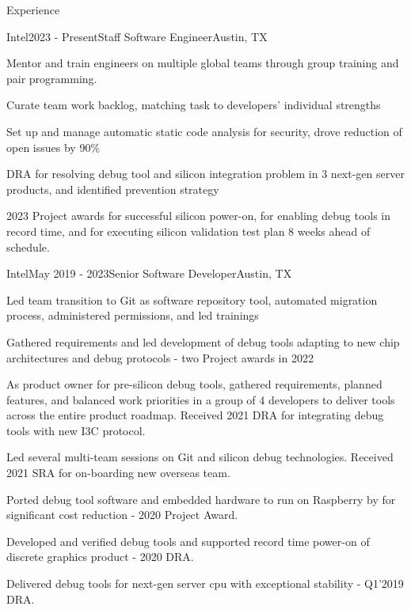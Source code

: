 \documentclass{resume} %
\begin{document}
\begin{rSection}{Experience}

\begin{rSubsection}{Intel}{2023 - Present}{Staff Software Engineer}{Austin, TX}
\item Mentor and train engineers on multiple global teams through group training and pair programming.
\item Curate team work backlog, matching task to developers' individual strengths
\item Set up and manage automatic static code analysis for security, drove reduction of open issues by 90\%
\item DRA for resolving debug tool and silicon integration problem in 3 next-gen server products, and identified prevention strategy
\item 2023 Project awards for successful silicon power-on, for enabling debug tools in record time, and for executing silicon validation test plan 8 weeks ahead of schedule.
\end{rSubsection}

\begin{rSubsection}{Intel}{May 2019 - 2023}{Senior Software Developer}{Austin, TX}
\item Led team transition to Git as software repository tool, automated migration process, administered permissions, and led trainings
\item Gathered requirements and led development of debug tools adapting to new chip architectures and debug protocols - two Project awards in 2022
\item As product owner for pre-silicon debug tools, gathered requirements, planned features, and balanced work priorities in a group of 4 developers to deliver tools across the entire product roadmap. Received 2021 DRA for integrating debug tools with new I3C protocol.
\item Led several multi-team sessions on Git and silicon debug technologies. Received 2021 SRA for on-boarding new overseas team.
\item Ported debug tool software and embedded hardware to run on Raspberry by for significant cost reduction - 2020 Project Award.
\item Developed and verified debug tools and supported record time power-on of discrete graphics product - 2020 DRA.
\item Delivered debug tools for next-gen server cpu with exceptional stability - Q1'2019 DRA.
\end{rSubsection}


\end{rSection}
\end{document}
